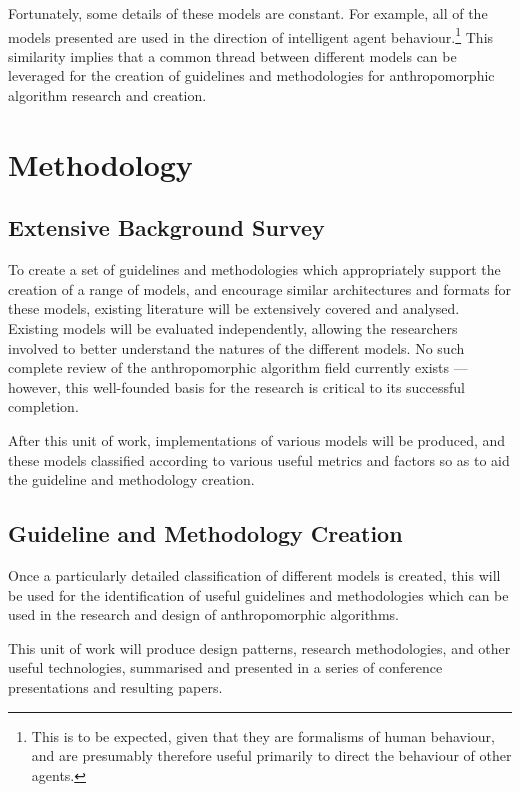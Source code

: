 Fortunately, some details of these models are constant. For example, all of the models presented are used in the direction of intelligent agent behaviour.\footnote{This is to be expected, given that they are formalisms of human behaviour, and are presumably therefore useful primarily to direct the behaviour of other agents.} This similarity implies that a common thread between different models can be leveraged for the creation of guidelines and methodologies for anthropomorphic algorithm research and creation.\par

\section{Methodology}
\label{sec:methodology}

\subsection{Extensive Background Survey}
To create a set of guidelines and methodologies which appropriately support the creation of a range of models, and encourage similar architectures and formats for these models, existing literature will be extensively covered and analysed. Existing models will be evaluated independently, allowing the researchers involved to better understand the natures of the different models. No such complete review of the anthropomorphic algorithm field currently exists --- however, this well-founded basis for the research is critical to its successful completion.\par

After this unit of work, implementations of various models will be produced, and these models classified according to various useful metrics and factors so as to aid the guideline and methodology creation.

\subsection{Guideline and Methodology Creation}
Once a particularly detailed classification of different models is created, this will be used for the identification of useful guidelines and methodologies which can be used in the research and design of anthropomorphic algorithms.\par

This unit of work will produce design patterns, research methodologies, and other useful technologies, summarised and presented in a series of conference presentations and resulting papers.\par

